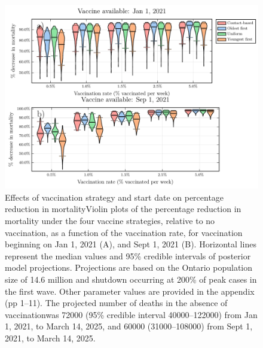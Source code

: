\begin{figure}
  \includegraphics[width=\textwidth]{chapter_3/vaccination_by_mortality_small.pdf}  
  \caption{Effects of vaccination strategy and start date on percentage reduction in mortalityViolin plots of the percentage reduction in mortality under the four vaccine strategies, relative to no vaccination, as a function of the vaccination rate, for vaccination beginning on Jan 1, 2021 (A), and Sept 1, 2021 (B). Horizontal lines represent the median values and 95\% credible intervals of posterior model projections. Projections are based on the Ontario population size of 14.6 million and shutdown occurring at 200\% of peak cases in the first wave. Other parameter values are provided in the appendix (pp 1–11). The projected number of deaths in the absence of vaccinationwas 72000 (95\% credible interval 40000–122000) from Jan 1, 2021, to March 14, 2025, and 60000 (31000–108000) from Sept 1, 2021, to March 14, 2025.}
  \label{fig4}
\end{figure}
